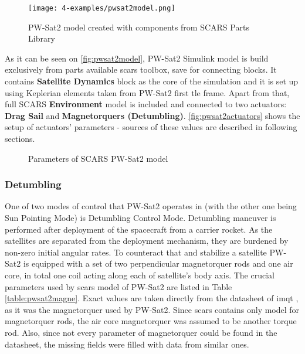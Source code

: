        \begin{figure}[H]
            \centering
            \texttt{[image: 4-examples/pwsat2model.png]}
            \caption{PW-Sat2 model created with components from SCARS Parts Library}
            \label{fig:pwsat2model}
        \end{figure}

        As it can be seen on \autoref{fig:pwsat2model}, PW-Sat2 Simulink model is build exclusively from parts available \ac{scars} toolbox, save for connecting blocks. It contains \textbf{Satellite Dynamics} block as the core of the simulation and it is set up using Keplerian elements taken from PW-Sat2 first \ac{tle} frame. Apart from that, full SCARS \textbf{Environment} model is included and connected to two actuators: \textbf{Drag Sail} and \textbf{Magnetorquers (Detumbling)}. \autoref{fig:pwsat2actuators} shows the setup of actuators' parameters - sources of these values are described in following sections. 

        
        \begin{figure}[H]
            \centering
            \qquad
            \caption{Parameters of SCARS PW-Sat2 model}%
            \label{fig:pwsat2actuators}%
        \end{figure}

        \subsubsection{Detumbling}
            One of two modes of control that PW-Sat2 operates in (with the other one being Sun Pointing Mode) is Detumbling Control Mode. Detumbling maneuver is performed after deployment of the spacecraft from a carrier rocket. As the satellites are separated from the deployment mechanism, they are burdened by non-zero initial angular rates. To counteract that and stabilize a satellite PW-Sat2 is equipped with a set of two perpendicular magnetorquer rods and one air core, in total one coil acting along each of satellite's body axis. The crucial parameters used by \ac{scars} model of PW-Sat2 are listed in Table \ref{table:pwsat2magne}.\cite{pwsat2adcs} Exact values are taken directly from the datasheet of \ac{imqt} \cite{imqt-datasheet}, as it was the magnetorquer used by PW-Sat2. Since \ac{scars} contains only model for magnetorquer rods, the air core magnetorquer was assumed to be another torque rod. Also, since not every parameter of magnetorquer could be found in the datasheet, the missing fields were filled with data from similar ones.

